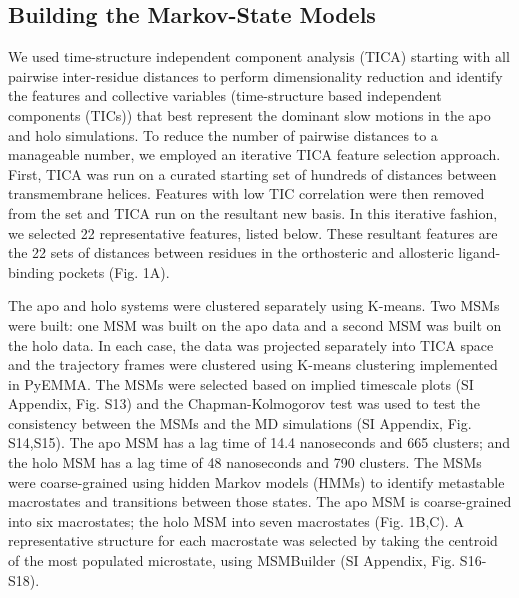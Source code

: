 \documentclass[9pt,twoside]{pnas-new}
\begin{document}
\subsection*{Building the Markov-State Models}
We used time-structure independent component analysis (TICA)\cite{Schwantes2013, Perez-Hernandez2013,Nuske2014} starting with all pairwise inter-residue distances to perform dimensionality reduction and identify the features and collective variables (time-structure based independent components (TICs)) that best represent the dominant slow motions in the apo and holo simulations.
To reduce the number of pairwise distances to a manageable number, we employed an iterative TICA feature selection approach.
First, TICA was run on a curated starting set of hundreds of distances between transmembrane helices.
Features with low TIC correlation were then removed from the set and TICA run on the resultant new basis.
In this iterative fashion, we selected 22 representative features, listed below.
These resultant features are the 22 sets of distances between residues in the orthosteric and allosteric ligand-binding pockets (Fig. 1A).

The apo and holo systems were clustered separately using K-means. 
Two MSMs were built: one MSM was built on the apo data and a second MSM was built on the holo data.
In each case, the data was projected separately into TICA space and the trajectory frames were clustered using K-means clustering implemented in PyEMMA\cite{Scherer2015}.
The MSMs were selected based on implied timescale plots (SI Appendix, Fig. S13) and the Chapman-Kolmogorov test\cite{Prinz2011a} was used to test the consistency between the MSMs and the MD simulations (SI Appendix, Fig. S14,S15).
The apo MSM has a lag time of 14.4 nanoseconds and 665 clusters; and the holo MSM has a lag time of 48 nanoseconds and 790 clusters.
The MSMs were coarse-grained using hidden Markov models (HMMs)\cite{Noe2013a} to identify metastable macrostates and transitions between those states.
The apo MSM is coarse-grained into six macrostates; the holo MSM into seven macrostates (Fig. 1B,C).
A representative structure for each macrostate was selected by taking the centroid of the most populated microstate, using MSMBuilder\cite{Beauchamp2011} (SI Appendix, Fig. S16-S18).
\end{document}
